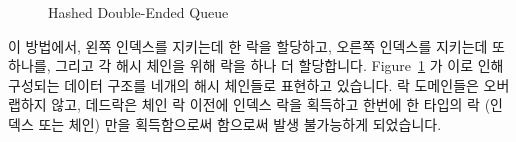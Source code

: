 \begin{figure}[tb]
\begin{center}
\end{center}
\caption{Hashed Double-Ended Queue}
\label{fig:SMPdesign:Hashed Double-Ended Queue}
\end{figure}

이 방법에서, 왼쪽 인덱스를 지키는데 한 락을 할당하고, 오른쪽 인덱스를 지키는데
또하나를, 그리고 각 해시 체인을 위해 락을 하나 더 할당합니다.
Figure~\ref{fig:SMPdesign:Hashed Double-Ended Queue} 가 이로 인해 구성되는
데이터 구조를 네개의 해시 체인들로 표현하고 있습니다.
락 도메인들은 오버랩하지 않고, 데드락은 체인 락 이전에 인덱스 락을 획득하고
한번에 한 타입의 락 (인덱스 또는 체인) 만을 획득함으로써 함으로써 발생
불가능하게 되었습니다.

